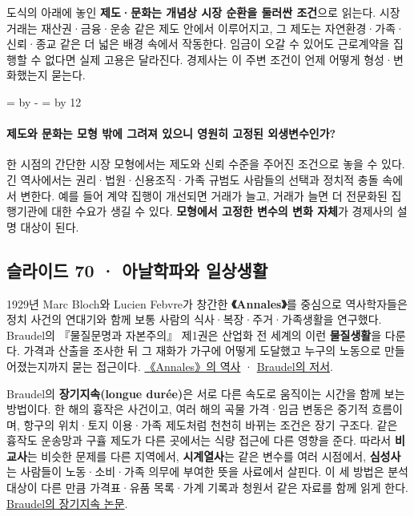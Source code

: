 \documentclass[10pt,a4paper]{article}
\newcommand{\ReserveQuestionSpace}{%
  \par\begingroup
  \dimen0=\pagegoal \advance\dimen0 by -\pagetotal
  \dimen2=\baselineskip \multiply\dimen2 by 12
  \ifdim\dimen0<\dimen2 \newpage\fi
  \endgroup}
\begin{document}
도식의 아래에 놓인 \textbf{제도·문화는 개념상 시장 순환을 둘러싼 조건}으로 읽는다. 시장 거래는 재산권·금융·운송 같은 제도 안에서 이루어지고, 그 제도는 자연환경·가족·신뢰·종교 같은 더 넓은 배경 속에서 작동한다. 임금이 오갈 수 있어도 근로계약을 집행할 수 없다면 실제 고용은 달라진다. 경제사는 이 주변 조건이 언제 어떻게 형성·변화했는지 묻는다.\par

\ReserveQuestionSpace
\paragraph{제도와 문화는 모형 밖에 그려져 있으니 영원히 고정된 외생변수인가?}
한 시점의 간단한 시장 모형에서는 제도와 신뢰 수준을 주어진 조건으로 놓을 수 있다. 긴 역사에서는 권리·법원·신용조직·가족 규범도 사람들의 선택과 정치적 충돌 속에서 변한다. 예를 들어 계약 집행이 개선되면 거래가 늘고, 거래가 늘면 더 전문화된 집행기관에 대한 수요가 생길 수 있다. \textbf{모형에서 고정한 변수의 변화 자체}가 경제사의 설명 대상이 된다.\par

\subsection{슬라이드 70 · 아날학파와 일상생활}
1929년 Marc Bloch와 Lucien Febvre가 창간한 \textbf{《Annales》}를 중심으로 역사학자들은 정치 사건의 연대기와 함께 보통 사람의 식사·복장·주거·가족생활을 연구했다. Braudel의 『물질문명과 자본주의』 제1권은 산업화 전 세계의 이런 \textbf{물질생활}을 다룬다. 가격과 산출을 조사한 뒤 그 재화가 가구에 어떻게 도달했고 누구의 노동으로 만들어졌는지까지 묻는 접근이다. \href{https://www.cambridge.org/core/journals/annales-histoire-sciences-sociales}{《Annales》의 역사} · \href{https://www.ucpress.edu/books/civilization-and-capitalism-15th-18th-century-vol-i/paper}{Braudel의 저서}.\par

Braudel의 \textbf{장기지속(longue durée)}은 서로 다른 속도로 움직이는 시간을 함께 보는 방법이다. 한 해의 흉작은 사건이고, 여러 해의 곡물 가격·임금 변동은 중기적 흐름이며, 항구의 위치·토지 이용·가족 제도처럼 천천히 바뀌는 조건은 장기 구조다. 같은 흉작도 운송망과 구휼 제도가 다른 곳에서는 식량 접근에 다른 영향을 준다. 따라서 \textbf{비교사}는 비슷한 문제를 다른 지역에서, \textbf{시계열사}는 같은 변수를 여러 시점에서, \textbf{심성사}는 사람들이 노동·소비·가족 의무에 부여한 뜻을 사료에서 살핀다. 이 세 방법은 분석 대상이 다른 만큼 가격표·유품 목록·가계 기록과 청원서 같은 자료를 함께 읽게 한다. \href{https://www.persee.fr/doc/ahess\_0395-2649\_1958\_num\_13\_4\_2781}{Braudel의 장기지속 논문}.\par
\end{document}
